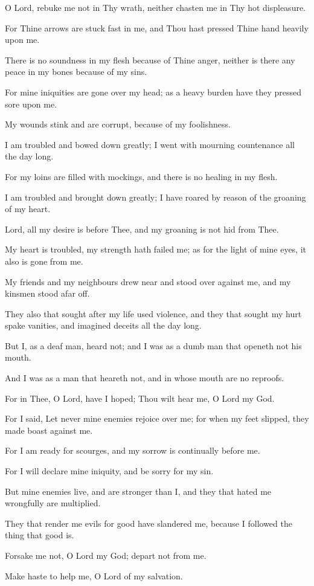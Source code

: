 O Lord, rebuke me not in Thy wrath, neither chasten me in Thy hot displeasure.

For Thine arrows are stuck fast in me, and Thou hast pressed Thine hand heavily upon me.

There is no soundness in my flesh because of Thine anger, neither is there any peace in my bones because of my sins.

For mine iniquities are gone over my head; as a heavy burden have they pressed sore upon me.

My wounds stink and are corrupt, because of my foolishness.

I am troubled and bowed down greatly; I went with mourning countenance all the day long.

For my loins are filled with mockings, and there is no healing in my flesh.

I am troubled and brought down greatly; I have roared by reason of the groaning of my heart.

Lord, all my desire is before Thee, and my groaning is not hid from Thee.

My heart is troubled, my strength hath failed me; as for the light of mine eyes, it also is gone from me.

My friends and my neighbours drew near and stood over against me, and my kinsmen stood afar off.

They also that sought after my life used violence, and they that sought my hurt spake vanities, and imagined deceits all the day long.

But I, as a deaf man, heard not; and I was as a dumb man that openeth not his mouth.

And I was as a man that heareth not, and in whose mouth are no reproofs.

For in Thee, O Lord, have I hoped; Thou wilt hear me, O Lord my God.

For I said, Let never mine enemies rejoice over me; for when my feet slipped, they made boast against me.

For I am ready for scourges, and my sorrow is continually before me.

For I will declare mine iniquity, and be sorry for my sin.

But mine enemies live, and are stronger than I, and they that hated me wrongfully are multiplied.

They that render me evils for good have slandered me, because I followed the thing that good is.

Forsake me not, O Lord my God; depart not from me.

Make haste to help me, O Lord of my salvation.
